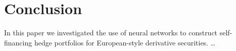 %

\section{Conclusion}
\label{sec:conclusion}

In this paper we investigated the use of neural networks to construct self-financing
hedge portfolios for European-style derivative securities. \ldots


